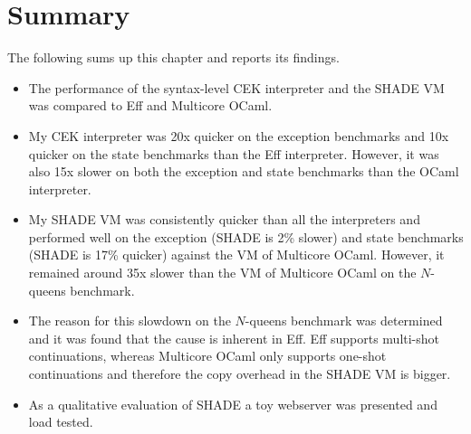 \documentclass[class=article, crop=false]{standalone}
\begin{document}
\section{Summary}
The following sums up this chapter and reports its findings.
\begin{itemize}
\item The performance of the syntax-level CEK interpreter and the SHADE VM was
compared to Eff and Multicore OCaml.
\item My CEK interpreter was 20x quicker on the exception benchmarks and 10x
quicker on the state benchmarks than the Eff interpreter. However, it was also
15x slower on both the exception and state benchmarks than the OCaml interpreter.
\item My SHADE VM was consistently quicker than all the interpreters and
performed well on the exception (SHADE is 2\% slower) and state benchmarks
(SHADE is 17\% quicker) against the VM of Multicore OCaml. However,
it remained around 35x slower than the VM of Multicore OCaml on the $N$-queens
benchmark.
\item The reason for this slowdown on the $N$-queens benchmark
was determined and it was found that the cause is inherent in Eff. Eff supports
multi-shot continuations, whereas Multicore OCaml only supports one-shot
continuations and therefore the copy overhead in the SHADE VM is bigger.
\item As a qualitative evaluation of SHADE a toy webserver was presented and
load tested.
\end{itemize}
\end{document}
